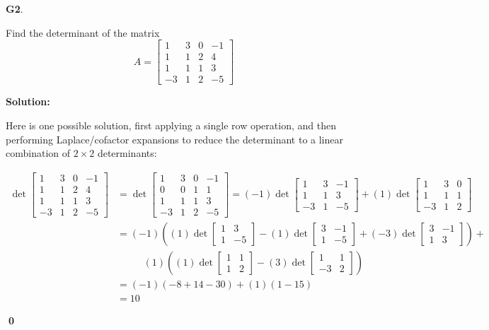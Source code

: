 \documentclass{article}
\newenvironment{problem}[1]
{
  \begin{flushleft}
  \textbf{#1}.
  \ignorespaces
}
{
  \end{flushleft}
}
\newenvironment{solution}
{
  \ignorespaces
  \textbf{Solution:}
}
{
  \ignorespacesafterend
  \begin{flushright}
  {\bfseries \qed}
  \end{flushright}
}
\begin{document}
\begin{problem}{G2}
Find the determinant of the matrix
\[
  A
    =
  \begin{bmatrix}
    1 & 3 & 0 & -1 \\
    1 & 1 & 2 & 4 \\
    1 & 1 & 1 & 3 \\
    -3 & 1 & 2 & -5
  \end{bmatrix}
\]
\end{problem}
\begin{solution}
Here is one possible solution, first applying a single row operation,
 and then performing Laplace/cofactor expansions to reduce the determinant
 to a linear combination of \(2\times 2\) determinants:

 \begin{align*}
\det
   \begin{bmatrix}
     1 & 3 & 0 & -1 \\
     1 & 1 & 2 & 4 \\
     1 & 1 & 1 & 3 \\
     -3 & 1 & 2 & -5
   \end{bmatrix}
 &= \det \begin{bmatrix} 1 & 3 & 0 & -1 \\ 0 & 0 & 1 & 1 \\ 1 & 1 & 1 & 3 \\ -3 & 1 & 2 & -5 \end{bmatrix} =
 (-1) \det \begin{bmatrix} 1 & 3 & -1 \\ 1 & 1 & 3 \\ -3 & 1 & -5 \end{bmatrix} + (1) \det \begin{bmatrix} 1 & 3 & 0 \\ 1 & 1 & 1 \\ -3 & 1 & 2 \end{bmatrix} \\
 &= (-1) \left( (1) \det \begin{bmatrix} 1 & 3 \\ 1 & -5 \end{bmatrix} - (1) \det \begin{bmatrix} 3 & -1 \\ 1 & -5 \end{bmatrix} + (-3) \det \begin{bmatrix} 3 & -1 \\ 1 & 3 \end{bmatrix} \right) + \\
 &\phantom{==} (1) \left( (1) \det \begin{bmatrix} 1 & 1 \\ 1 & 2 \end{bmatrix} - (3) \det \begin{bmatrix} 1 & 1 \\ -3 & 2 \end{bmatrix} \right) \\
 &= (-1) \left( -8+14-30 \right) + (1) \left(1-15 \right) \\
 &=10
 \end{align*}


\end{solution}
\end{document}
